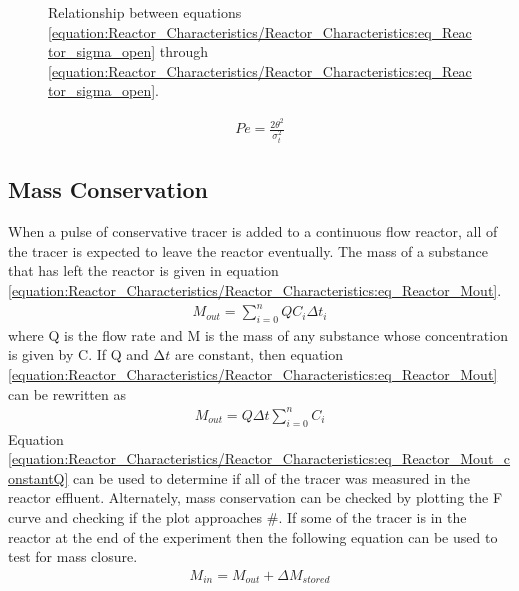 \documentclass[letterpaper,10pt,english]{sphinxmanual}
\let\sphinxpxdimen\pdfpxdimen\else\newdimen\sphinxpxdimen
\begin{document}
\begin{figure}[htbp]
\centering
\capstart

\noindent\sphinxincludegraphics[width=300\sphinxpxdimen]{{Pe_open_and_closed}.png}
\caption{Relationship between equations \eqref{equation:Reactor_Characteristics/Reactor_Characteristics:eq_Reactor_sigma_open} through \eqref{equation:Reactor_Characteristics/Reactor_Characteristics:eq_Reactor_sigma_open}.}\label{\detokenize{Reactor_Characteristics/Reactor_Characteristics:id8}}\label{\detokenize{Reactor_Characteristics/Reactor_Characteristics:figure-pe-open-and-closed}}\end{figure}
\begin{equation}\label{equation:Reactor_Characteristics/Reactor_Characteristics:eq_Reactor_sigma_approx}
\begin{split}Pe=\frac{2\theta ^{2} }{\sigma _{t}^{2} }\end{split}
\end{equation}

\subsection{Mass Conservation}
\label{\detokenize{Reactor_Characteristics/Reactor_Characteristics:mass-conservation}}
When a pulse of conservative tracer is added to a continuous flow reactor, all of the tracer is expected to leave the reactor eventually. The mass of a substance that has left the reactor is given in equation \eqref{equation:Reactor_Characteristics/Reactor_Characteristics:eq_Reactor_Mout}.
\begin{equation}\label{equation:Reactor_Characteristics/Reactor_Characteristics:eq_Reactor_Mout}
\begin{split}M_{out} =\sum _{i=0}^{n}QC_{i} \Delta t_{i}\end{split}
\end{equation}
where Q is the flow rate and M is the mass of any substance whose concentration is given by C. If Q and \(\mathrm{\Delta}t\) are constant, then equation \eqref{equation:Reactor_Characteristics/Reactor_Characteristics:eq_Reactor_Mout} can be rewritten as
\begin{equation}\label{equation:Reactor_Characteristics/Reactor_Characteristics:eq_Reactor_Mout_constantQ}
\begin{split}M_{out} =Q\Delta t\sum _{i=0}^{n}C_{i}\end{split}
\end{equation}
Equation \eqref{equation:Reactor_Characteristics/Reactor_Characteristics:eq_Reactor_Mout_constantQ} can be used to determine if all of the tracer was measured in the reactor effluent. Alternately, mass conservation can be checked by plotting the F curve and checking if the plot approaches \#. If some of the tracer is in the reactor at the end of the experiment then the following equation can be used to test for mass closure.
\begin{equation}\label{equation:Reactor_Characteristics/Reactor_Characteristics:Reactor_Characteristics/Reactor_Characteristics:13}
\begin{split}M_{in} =M_{out} +\Delta M_{stored}\end{split}
\end{equation}
\end{document}
